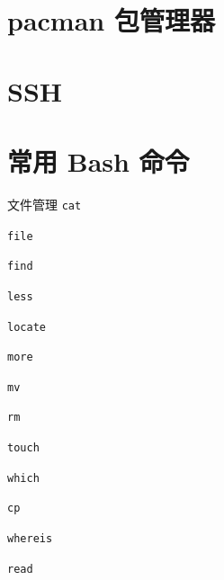 \documentclass{ctexart}
\begin{document}
\clearpage
\section{pacman 包管理器}





\clearpage
\section{SSH}



\clearpage
\section{常用 Bash 命令}
\begin{mybox}{文件管理}
    \texttt{cat}

    \texttt{file}

    \texttt{find}

    \texttt{less}

    \texttt{locate}

    \texttt{more}

    \texttt{mv}

    \texttt{rm}

    \texttt{touch}

    \texttt{which}

    \texttt{cp}

    \texttt{whereis}

    \texttt{read}
\end{mybox}
\end{document}
